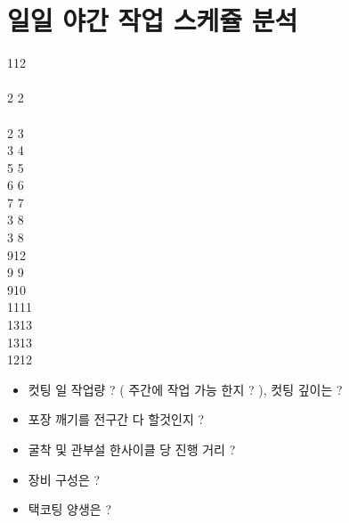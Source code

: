 \documentclass[12pt,a3paper,landscape,oneside]{book}
\begin{document}
	\newpage
	\section{일일 야간 작업 스케쥴 분석}

			\begin{ganttchart}[	hgrid, 
								vgrid,
								x unit=0.8cm,
								y unit chart=0.6cm,
								y unit title=0.8cm,
							]{1}{12}
			 \\
			 \\
				{ 2}{ 2} \\
			 \\
						{ 2}{ 3} \\
					{ 3}{ 4} \\
					{ 5}{ 5} \\
					{ 6}{ 6} \\
					{ 7}{ 7} \\

					{ 3}{ 8} \\
						{ 3}{ 8} \\

				{ 9}{12} \\
					{ 9}{ 9} \\
					{ 9}{10} \\
						{11}{11} \\
							{13}{13} \\
							{13}{13} \\
					{12}{12} \\

			\end{ganttchart}

			\begin{itemize}
			\item 컷팅 일 작업량 ? ( 주간에 작업 가능 한지 ? ), 컷팅 깊이는 ?
			\item 포장 깨기를 전구간 다 할것인지 ?
			\item 굴착 및 관부설 한사이클 당 진행 거리 ?
			\item 장비 구성은 ?
			\item 택코팅 양생은 ?

			\end{itemize}
\end{document}
